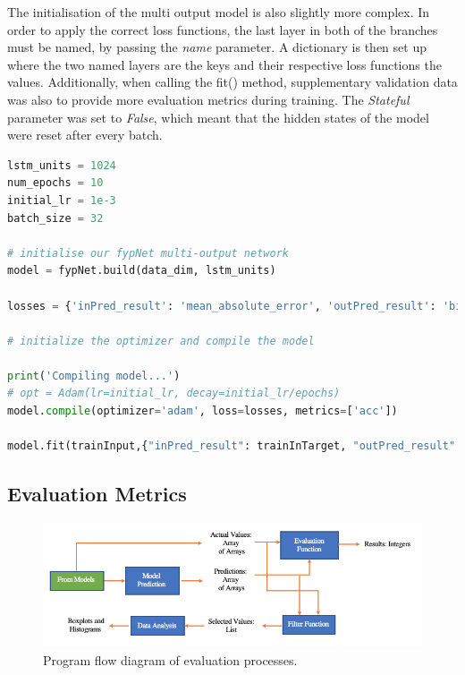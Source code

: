 \documentclass[10pt,onecolumn,letterpaper]{article}
\begin{document}
The initialisation of the multi output model is also slightly more complex. In order to apply the correct loss functions, the last layer in both of the branches must be named, by passing the \textit{name} parameter. A dictionary is then set up where the two named layers are the keys and their respective loss functions the values. Additionally, when calling the fit() method, supplementary validation data was also to provide more evaluation metrics during training. The \textit{Stateful} parameter was set to \textit{False}, which meant that the hidden states of the model were reset after every batch.
 
\begin{lstlisting}[language=Python, breaklines=true, caption={Initialisation, compilation and training implementation for the multi output model}]
lstm_units = 1024
num_epochs = 10
initial_lr = 1e-3
batch_size = 32

# initialise our fypNet multi-output network
model = fypNet.build(data_dim, lstm_units)
 
losses = {'inPred_result': 'mean_absolute_error', 'outPred_result': 'binary_crossentropy'}
 
# initialize the optimizer and compile the model

print('Compiling model...')
# opt = Adam(lr=initial_lr, decay=initial_lr/epochs)
model.compile(optimizer='adam', loss=losses, metrics=['acc'])    

model.fit(trainInput,{"inPred_result": trainInTarget, "outPred_result": trainTarget}, validation_data=(valInput, {"inPred_result": trainValTarget, "outPred_result": valTarget}), batch_size = batch_size, Stateful=False, epochs=num_epochs, verbose=1)

\end{lstlisting} 

\subsection{Evaluation Metrics} 

\begin{figure}[!hbt!]
\centering
\includegraphics[width=\columnwidth]{evaluationflow.png}
\caption{Program flow diagram of evaluation processes.}
\label{evaluationflow}
\end{figure}
\end{document}
